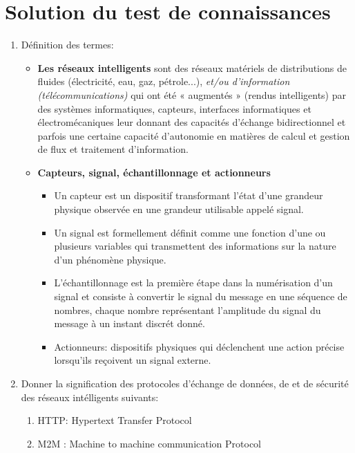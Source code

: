 
\section*{Solution du test de connaissances \MarksOne}
\begin{enumerate}
    \item Définition des termes:
          \begin{itemize}
              \item{\textbf{Les réseaux intelligents} sont des réseaux matériels de distributions de fluides (électricité, eau, gaz, pétrole...), \emph{et/ou d'information (télécommunications)} qui ont été « augmentés » (rendus intelligents) par des systèmes informatiques, capteurs, interfaces informatiques et électromécaniques leur donnant des capacités d'échange bidirectionnel et parfois une certaine capacité d'autonomie en matières de calcul et gestion de flux et traitement d'information.}
              \item \textbf{Capteurs, signal, échantillonnage et actionneurs}
                    \begin{itemize}
                        \item Un capteur est un dispositif transformant l'état d'une grandeur physique observée en une grandeur utilisable appelé signal.
                        \item Un signal est formellement définit comme une fonction d'une ou plusieurs variables qui transmettent des informations sur la nature d'un phénomène physique.
                        \item L'échantillonnage est la première étape dans la numérisation d'un signal et consiste à convertir le signal du message en une séquence de nombres, chaque nombre représentant l'amplitude du signal du message à un instant discrét donné.
                        \item Actionneurs: dispositifs physiques qui déclenchent une action précise lorsqu'ils reçoivent un signal externe.
                    \end{itemize}
          \end{itemize}
    \item Donner la signification des protocoles d'échange de données, de et de sécurité des réseaux intélligents suivants:
          \begin{enumerate}
              \item HTTP:  Hypertext Transfer Protocol
              \item M2M : Machine to machine communication Protocol

\end{enumerate}
\end{enumerate}
